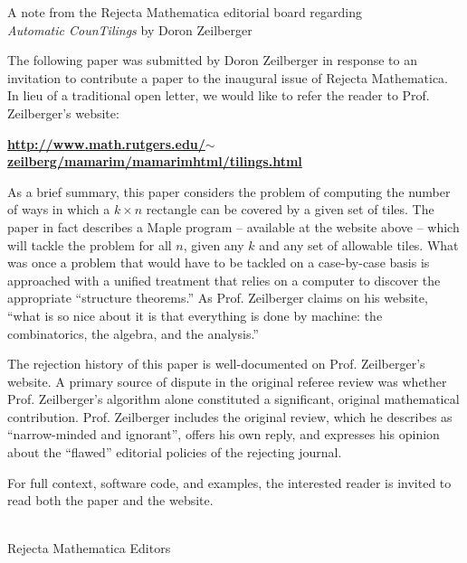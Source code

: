 \documentclass[11pt]{article}
\begin{document}
\begin{center}
\Large{A note from the Rejecta Mathematica editorial board
regarding}\\ 
\LARGE{\emph{Automatic CounTilings} by Doron Zeilberger}
\end{center}

The following paper was submitted by Doron Zeilberger in response to an invitation to contribute a paper to the inaugural issue of Rejecta Mathematica. In lieu of a traditional open letter, we would like to refer the reader to Prof. Zeilberger's website:

\begin{center}
\href{http://www.math.rutgers.edu/~zeilberg/mamarim/mamarimhtml/tilings.html}{\textbf{http://www.math.rutgers.edu/$\sim$zeilberg/mamarim/mamarimhtml/tilings.html}}
\end{center}

As a brief summary, this paper considers the problem of computing the number of ways in which a $k \times n$ rectangle can be covered by a given set of tiles. The paper in fact describes a Maple program -- available at the website above -- which will tackle the problem for all $n$, given any $k$ and any set of allowable tiles. What was once a problem that would have to be tackled on a case-by-case basis is approached with a unified treatment that relies on a computer to discover the appropriate ``structure theorems.'' As Prof. Zeilberger claims on his website, ``what is so nice about it is that everything is done by machine: the combinatorics, the algebra, and the analysis.''

The rejection history of this paper is well-documented on Prof. Zeilberger's website. A primary source of dispute in the original referee review was whether Prof. Zeilberger's algorithm alone constituted a significant, original mathematical contribution. Prof. Zeilberger includes the original review, which he describes as ``narrow-minded and ignorant'', offers his own reply, and expresses his opinion about the ``flawed'' editorial policies of the rejecting journal. 

For full context, software code, and examples, the interested reader is invited to read both the paper and the website.

\hfill\\

\hfill Rejecta Mathematica Editors
\end{document}
